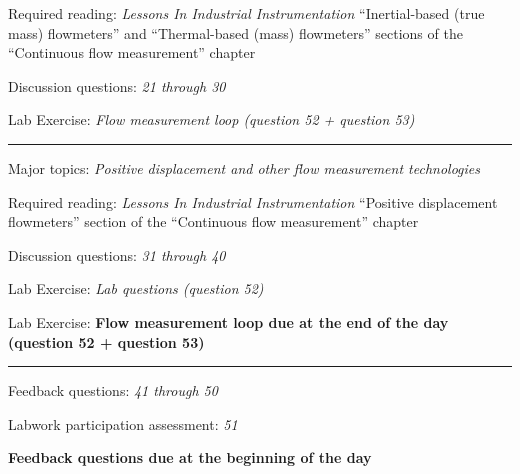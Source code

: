 \hskip 10pt Required reading: {\it Lessons In Industrial Instrumentation} ``Inertial-based (true mass) flowmeters'' and ``Thermal-based (mass) flowmeters'' sections of the ``Continuous flow measurement'' chapter
 
\hskip 10pt Discussion questions: {\it 21 through 30}
 
\hskip 10pt Lab Exercise: {\it Flow measurement loop (question 52 + question 53)}




\vskip 10pt
\hrule \vskip 5pt
\noindent
{}

\hskip 10pt Major topics: {\it Positive displacement and other flow measurement technologies}
 
\hskip 10pt Required reading: {\it Lessons In Industrial Instrumentation} ``Positive displacement flowmeters'' section of the ``Continuous flow measurement'' chapter
 
\hskip 10pt Discussion questions: {\it 31 through 40}
 
\hskip 10pt Lab Exercise: {\it Lab questions (question 52)}

\hskip 10pt Lab Exercise: {\bf Flow measurement loop due at the end of the day (question 52 + question 53)}
 



\vskip 10pt
\hrule \vskip 5pt
\noindent
{}

\hskip 10pt Feedback questions: {\it 41 through 50}
 
\hskip 10pt Labwork participation assessment: {\it 51}
 
\hskip 10pt {\bf Feedback questions due at the beginning of the day}
 
\vskip 10pt

